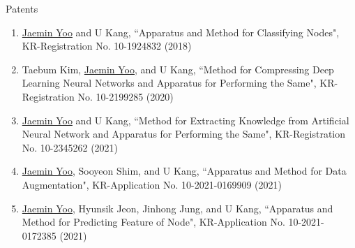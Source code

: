 \documentclass{resume} %
\begin{document}

\begin{rSection}{Patents}
\smallskip
\begin{enumerate}

	\item \underline{Jaemin Yoo} and U Kang, ``Apparatus and Method for Classifying Nodes", KR-Registration No. 10-1924832 (2018)
		
	\item Taebum Kim, \underline{Jaemin Yoo}, and U Kang, ``Method for Compressing Deep Learning Neural Networks and Apparatus for Performing the Same", KR-Registration No. 10-2199285 (2020)

	\item \underline{Jaemin Yoo} and U Kang, ``Method for Extracting Knowledge from Artificial Neural Network and Apparatus for Performing the Same", KR-Registration No. 10-2345262 (2021)
		
	\item \underline{Jaemin Yoo}, Sooyeon Shim, and U Kang, ``Apparatus and Method for Data Augmentation", KR-Application No. 10-2021-0169909 (2021)
		
	\item \underline{Jaemin Yoo}, Hyunsik Jeon, Jinhong Jung, and U Kang, ``Apparatus and Method for Predicting Feature of Node", KR-Application No. 10-2021-0172385 (2021)

\end{enumerate}
\end{rSection}

\end{document}
